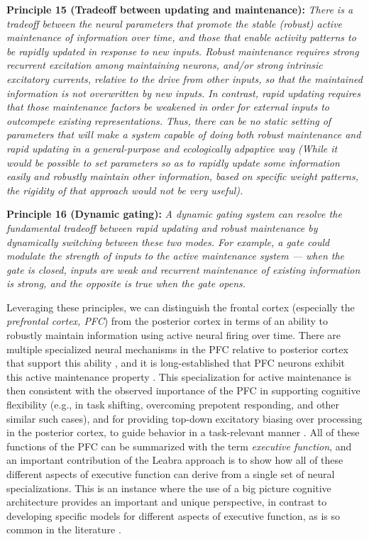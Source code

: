 \documentclass[11pt,twoside]{article}
\begin{document}
{\bf Principle 15 (Tradeoff between updating and maintenance):} {\em
  There is a tradeoff between the neural parameters that promote the
  stable (robust) active maintenance of information over time, and
  those that enable activity patterns to be rapidly updated in
  response to new inputs.  Robust maintenance requires strong
  recurrent excitation among maintaining neurons, and/or strong
  intrinsic excitatory currents, relative to the drive from other
  inputs, so that the maintained information is not overwritten by new
  inputs.  In contrast, rapid updating requires that those maintenance
  factors be weakened in order for external inputs to outcompete
  existing representations.  Thus, there can be no static setting of
  parameters that will make a system capable of doing both robust
  maintenance and rapid updating in a general-purpose and ecologically
  adpaptive way (While it would be possible to set parameters so as to
  rapidly update some information easily and robustly maintain {\em
    other} information, based on specific weight patterns, the
  rigidity of that approach would not be very useful).}

{\bf Principle 16 (Dynamic gating):} {\em A dynamic gating system can
  resolve the fundamental tradeoff between rapid updating and robust
  maintenance by dynamically switching between these two modes.  For
  example, a gate could modulate the strength of inputs to the active
  maintenance system --- when the gate is closed, inputs are weak and
  recurrent maintenance of existing information is strong, and the
  opposite is true when the gate opens.}

Leveraging these principles, we can distinguish the frontal cortex
(especially the {\em prefrontal cortex, PFC}) from the posterior
cortex in terms of an ability to robustly maintain information using
active neural firing over time.  There are multiple specialized neural
mechanisms in the PFC relative to posterior cortex that support this
ability \cite{WangMarkramGoodmanEtAl06,HazyPauliHerdEtAlInPrep}, and
it is long-established that PFC neurons exhibit this active
maintenance property
\cite{FusterAlexander71,GoldmanRakic95,KubotaNiki71,MillerEricksonDesimone96,MiyashitaChang88}.
This specialization for active maintenance is then consistent with the
observed importance of the PFC in supporting cognitive flexibility
(e.g., in task shifting, overcoming prepotent responding, and other
similar such cases), and for providing top-down excitatory biasing
over processing in the posterior cortex, to guide behavior in a
task-relevant manner
\cite{BraverCohen00,CohenDunbarMcClelland90,CohenServanSchrieber92,HerdBanichOReilly06,MillerCohen01}.
All of these functions of the PFC can be summarized with the term {\em
  executive function}, and an important contribution of the Leabra
approach is to show how all of these different aspects of executive
function can derive from a single set of neural specializations.  This
is an instance where the use of a big picture cognitive architecture
provides an important and unique perspective, in contrast to
developing specific models for different aspects of executive
function, as is so common in the literature \cite{spec-ef-models}.
\end{document}
